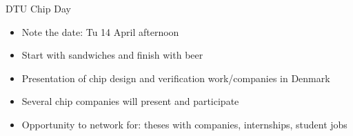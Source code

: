 \begin{frame}[fragile]{DTU Chip Day}
\begin{itemize}
\item Note the date: Tu 14 April afternoon
\item Start with sandwiches and finish with beer
\item Presentation of chip design and verification work/companies in Denmark
\item Several chip companies will present and participate
\item Opportunity to network for: theses with companies, internships, student jobs
\end{itemize}
\end{frame}


